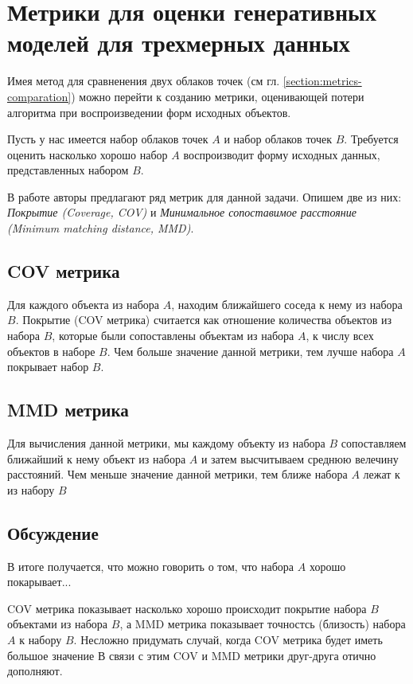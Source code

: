 \section{Метрики для оценки генеративных моделей для трехмерных данных} \label{section:metrics-evaluation}

Имея метод для сравненения двух облаков точек (см гл. \ref{section:metrics-comparation}) можно перейти к созданию метрики, оценивающей потери алгоритма при воспроизведении форм исходных объектов.

Пусть у нас имеется набор облаков точек \(A\) и набор облаков точек \(B\). Требуется оценить насколько хорошо набор \(A\) воспроизводит форму исходных данных, представленных набором \(B\).

В работе \cite{lrgm-cloud} авторы предлагают ряд метрик для данной задачи. Опишем две из них: \textit{Покрытие (Coverage, COV)} и \textit{Минимальное сопоставимое расстояние (Minimum matching distance, MMD)}.


\subsection{COV метрика}

Для каждого объекта из набора \(A\), находим ближайшего соседа к нему из набора \(B\). Покрытие (COV метрика) считается как отношение количества объектов из набора \(B\), которые были сопоставлены объектам из набора \(A\), к числу всех объектов в наборе \(B\). Чем больше значение данной метрики, тем лучше набора \(A\) покрывает набор \(B\). \cite{lrgm-cloud}

\subsection{MMD метрика}

Для вычисления данной метрики, мы каждому объекту из набора \(B\) сопоставляем ближайший к нему объект из набора \(A\) и затем высчитываем среднюю велечину расстояний. Чем меньше значение данной метрики, тем ближе набора \(A\) лежат к из набору \(B\) \cite{lrgm-cloud}


\subsection{Обсуждение}

В итоге получается, что можно говорить о том, что набора \(A\) хорошо покарывает...

COV метрика показывает насколько хорошо происходит покрытие набора \(B\) объектами из набора \(B\), а MMD метрика показывает точностсь (близость) набора \(A\) к набору \(B\). 
Несложно придумать случай, когда COV метрика будет иметь большое значение 
В связи с этим COV и MMD метрики друг-друга отично дополняют.